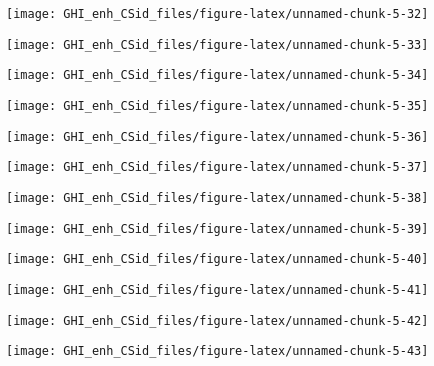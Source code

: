 \documentclass[
  10pt,
  a4paper,oneside]{article}
\begin{document}
\begin{center}\texttt{[image: GHI\_enh\_CSid\_files/figure-latex/unnamed-chunk-5-32]} \end{center}

\begin{center}\texttt{[image: GHI\_enh\_CSid\_files/figure-latex/unnamed-chunk-5-33]} \end{center}

\begin{center}\texttt{[image: GHI\_enh\_CSid\_files/figure-latex/unnamed-chunk-5-34]} \end{center}

\begin{center}\texttt{[image: GHI\_enh\_CSid\_files/figure-latex/unnamed-chunk-5-35]} \end{center}

\begin{center}\texttt{[image: GHI\_enh\_CSid\_files/figure-latex/unnamed-chunk-5-36]} \end{center}

\begin{center}\texttt{[image: GHI\_enh\_CSid\_files/figure-latex/unnamed-chunk-5-37]} \end{center}

\begin{center}\texttt{[image: GHI\_enh\_CSid\_files/figure-latex/unnamed-chunk-5-38]} \end{center}

\begin{center}\texttt{[image: GHI\_enh\_CSid\_files/figure-latex/unnamed-chunk-5-39]} \end{center}

\begin{center}\texttt{[image: GHI\_enh\_CSid\_files/figure-latex/unnamed-chunk-5-40]} \end{center}

\begin{center}\texttt{[image: GHI\_enh\_CSid\_files/figure-latex/unnamed-chunk-5-41]} \end{center}

\begin{center}\texttt{[image: GHI\_enh\_CSid\_files/figure-latex/unnamed-chunk-5-42]} \end{center}

\begin{center}\texttt{[image: GHI\_enh\_CSid\_files/figure-latex/unnamed-chunk-5-43]} \end{center}
\end{document}
